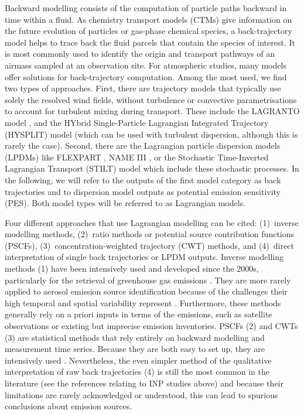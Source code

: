     Backward modelling consists of the computation of particle paths backward in time within a fluid.
    As chemistry transport models (CTMs) give information on the future evolution of particles or gas-phase chemical species, a back-trajectory model helps to trace back the fluid parcels that contain the species of interest. It is most commonly used to identify the origin and transport pathways of an airmass sampled at an observation site.
    For atmospheric studies, many models offer solutions for back-trajectory computation.
    Among the most used, we find two types of approaches.
    First, there are trajectory models that typically use solely the resolved wind fields, without turbulence or convective parametrisations to account for turbulent mixing during transport. These include the LAGRANTO model  \citep{sprenger_lagranto_2015}, and the HYbrid Single-Particle Lagrangian Integrated Trajectory (HYSPLIT) model \citep{stein_noaas_2015} (which can be used with turbulent dispersion, although this is rarely the case). Second, there are the Lagrangian particle dispersion models (LPDMs) like FLEXPART \citep{pisso_lagrangian_2019}, NAME III \citep{jones_uk_2007}, or the Stochastic Time-Inverted Lagrangian Transport (STILT) model \citep{wen_backward-time_2012} which include these stochastic processes. 
    In the following, we will refer to the outputs of the first model category as {back trajectories} and to dispersion model outputs as {potential emission sensitivity} (PES). Both model types will be referred to as Lagrangian models.

    Four different approaches that use Lagrangian modelling can be cited: (1)~inverse modelling methods, (2)~ratio methods or potential source contribution functions (PSCFs), (3)~concentration-weighted trajectory (CWT) methods, and (4)~direct interpretation of single back trajectories or LPDM outputs. Inverse modelling methods (1) have been intensively used and developed since the 2000s, particularly for the retrieval of greenhouse gas emissions \citep{stohl_analytical_2009, manning_estimating_2011, brunner_estimating_2012, fang_multiannual_2015}. They are more rarely applied to aerosol emission source identification because of the challenges their high temporal and spatial variability represent \citep{dubovik_retrieving_2008, partridge_inverse_2011}. Furthermore, these methods generally rely on a priori inputs in terms of the emissions, such as satellite observations or existing but imprecise emission inventories. PSCFs (2) \citep{ashbaugh_residence_1985, zeng_study_1989} and CWTs (3) \citep{hsu_comparison_2003} are statistical methods that rely entirely on backward modelling and measurement time series. Because they are both easy to set up, they are intensively used \citep[e.g.,][]{polissar_aerosol_1999, hirdman_source_2010, irish_ice_2019, ren_use_2021}.
    Nevertheless, the even simpler method of the qualitative interpretation of raw back trajectories (4) is still the most common in the literature (see the references relating to INP studies above) and because their limitations are rarely acknowledged or understood, this can lead to spurious conclusions about emission sources.

